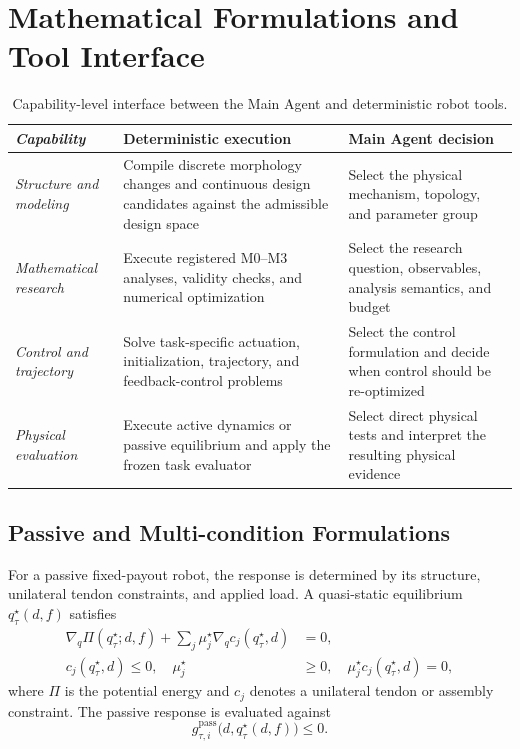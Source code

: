 \section{Mathematical Formulations and Tool Interface}
\label{app:mathematical-details}
\begin{table}[!t]
\centering
\caption{Capability-level interface between the Main Agent and deterministic robot tools.}
\label{tab:tool-action-taxonomy}
\papertablestyle
\begin{tabularx}{\textwidth}{@{}>{\itshape}p{}!{\color{TraceGray}\vrule width 0.25pt} X X@{}}
\toprule
\normalfont\textbf{Capability} & \textbf{Deterministic execution} & \textbf{Main Agent decision} \\
\midrule
Structure and modeling & Compile discrete morphology changes and continuous design candidates against the admissible design space & Select the physical mechanism, topology, and parameter group \\
Mathematical research & Execute registered M0--M3 analyses, validity checks, and numerical optimization & Select the research question, observables, analysis semantics, and budget \\
Control and trajectory & Solve task-specific actuation, initialization, trajectory, and feedback-control problems & Select the control formulation and decide when control should be re-optimized \\
Physical evaluation & Execute active dynamics or passive equilibrium and apply the frozen task evaluator & Select direct physical tests and interpret the resulting physical evidence \\
\bottomrule
\end{tabularx}
\end{table}
\subsection{Passive and Multi-condition Formulations}
For a passive fixed-payout robot, the response is determined by its structure, unilateral tendon constraints, and applied load. A quasi-static equilibrium $q^\star_\tau(d,f)$ satisfies
\begin{equation}
\begin{aligned}
\nabla_q\Pi(q^\star_\tau;d,f)
+\sum_j\mu^\star_j\nabla_q c_j(q^\star_\tau,d)&=0,\\
c_j(q^\star_\tau,d)\leq0,\quad
\mu^\star_j&\geq0,\quad
\mu^\star_jc_j(q^\star_\tau,d)=0,
\end{aligned}
\label{eq:passive-problem}
\end{equation}
where $\Pi$ is the potential energy and $c_j$ denotes a unilateral tendon or assembly constraint. The passive response is evaluated against
\begin{equation}
g^{\mathrm{pass}}_{\tau,i}
\bigl(d,q^\star_\tau(d,f)\bigr)\leq0.
\label{eq:passive-constraints}
\end{equation}

